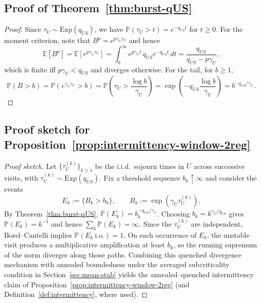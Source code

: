\documentclass[12pt,a4paper]{article}
\theoremstyle{plain}
\theoremstyle{definition}
\theoremstyle{remark}
\begin{document}
	\subsection*{Proof of Theorem~\ref{thm:burst-qUS}}
	\label{app:proof-burst}
	\begin{proof}[Proof] %
		Since $\tau_U\sim\mathrm{Exp}(q_{US})$, we have $\mathbb P(\tau_U>t)=e^{-q_{US}t}$ for $t\ge 0$.
		For the moment criterion, note that $B^p=e^{p\gamma_U\tau_U}$ and hence
		\[
		\mathbb E[B^p]=\mathbb E[e^{p\gamma_U\tau_U}]
		=
		\int_0^\infty e^{p\gamma_U t}\,q_{US}e^{-q_{US}t}\,dt
		=
		\frac{q_{US}}{q_{US}-p\gamma_U},
		\]
		which is finite iff $p\gamma_U<q_{US}$ and diverges otherwise.
		For the tail, for $b\ge 1$,
		\[
		\mathbb P(B>b)=\mathbb P\!\left(e^{\gamma_U\tau_U}>b\right)
		=\mathbb P\!\left(\tau_U>\frac{\log b}{\gamma_U}\right)
		=\exp\!\left(-q_{US}\frac{\log b}{\gamma_U}\right)
		=b^{-q_{US}/\gamma_U}.
		\]
	\end{proof}
	
	\subsection*{Proof sketch for Proposition~\ref{prop:intermittency-window-2reg}}
	\label{app:proof-intermittency-window}
	\begin{proof}[Proof sketch]
		Let $\{\tau_U^{(k)}\}_{k\ge1}$ be the i.i.d.\ sojourn times in $U$ across successive visits,
		with $\tau_U^{(k)}\sim\mathrm{Exp}(q_{US})$.
		Fix a threshold sequence $b_k\uparrow\infty$ and consider the events
		\[
		E_k:=\{B_k>b_k\},\qquad B_k:=\exp(\gamma_U\tau_U^{(k)}).
		\]
		By Theorem~\ref{thm:burst-qUS}, $\mathbb P(E_k)=b_k^{-q_{US}/\gamma_U}$.
		Choosing $b_k=k^{\gamma_U/q_{US}}$ gives $\mathbb P(E_k)=k^{-1}$ and hence
		$\sum_k \mathbb P(E_k)=\infty$.
		Since the $\tau_U^{(k)}$ are independent, Borel--Cantelli implies
		$\mathbb P(E_k\ \text{i.o.})=1$.
		On each occurrence of $E_k$, the unstable visit produces a multiplicative amplification at least $b_k$,
		so the running supremum of the norm diverges along those paths.
		Combining this quenched divergence mechanism with annealed boundedness under the
		averaged subcriticality condition in Section~\ref{sec:mean-stab} yields the
		annealed--quenched intermittency claim of Proposition~\ref{prop:intermittency-window-2reg}
		(and Definition~\ref{def:intermittency}, where used).
	\end{proof}
	
\end{document}
